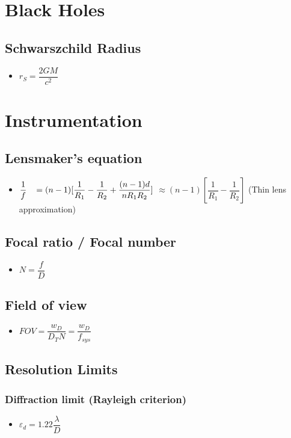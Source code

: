 \documentclass[]{report}
\newcommand \tab[1][1cm]{\hspace*{#1}}
\newcommand{\itemt}{\item \tab}
\begin{document}
	\section{Black Holes}

\subsection{Schwarszchild Radius}		
\begin{itemize}
\itemt \( r_S = \dfrac{2GM}{c^2} \)
\end{itemize}

	\section{Instrumentation}

\subsection{Lensmaker's equation}
\begin{itemize}
\itemt \( \dfrac{1}{f} \hspace*{0.3cm} = (n-1)[\dfrac{1}{R_1} - \dfrac{1}{R_2}+\dfrac{(n-1)d}{nR_1R_2}] \)
\subitem \hspace*{0.85cm} \( \approx (n-1)[\dfrac{1}{R_1} - \dfrac{1}{R_2}] \) \tab     (Thin lens approximation)
\end{itemize}

\subsection{Focal ratio / Focal number}
\begin{itemize}
\itemt \( N = \dfrac{f}{D} \)
\end{itemize}			

\subsection{Field of view}		
\begin{itemize}
\itemt \( FOV = \dfrac{w_D}{D_T N} = \dfrac{w_D}{f_{sys}} \)
\end{itemize}

\subsection{Resolution Limits}		

\subsubsection{Diffraction limit (Rayleigh criterion)}			
\begin{itemize}
\itemt \( \varepsilon_d = 1.22 \dfrac{\lambda}{D} \)
\end{itemize}			
\end{document}
